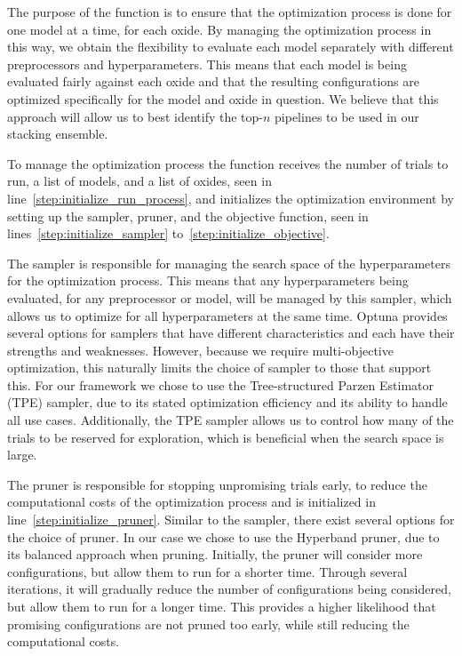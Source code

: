 The purpose of the  function is to ensure that the optimization process is done for one model at a time, for each oxide.
By managing the optimization process in this way, we obtain the flexibility to evaluate each model separately with different preprocessors and hyperparameters.
This means that each model is being evaluated fairly against each oxide and that the resulting configurations are optimized specifically for the model and oxide in question.
We believe that this approach will allow us to best identify the top-$n$ pipelines to be used in our stacking ensemble.

To manage the optimization process the function receives the number of trials to run, a list of models, and a list of oxides, seen in line~\ref{step:initialize_run_process}, and initializes the optimization environment by setting up the sampler, pruner, and the objective function, seen in lines~\ref{step:initialize_sampler} to~\ref{step:initialize_objective}.

The sampler is responsible for managing the search space of the hyperparameters for the optimization process.
This means that any hyperparameters being evaluated, for any preprocessor or model, will be managed by this sampler, which allows us to optimize for all hyperparameters at the same time.
Optuna provides several options for samplers that have different characteristics and each have their strengths and weaknesses.
However, because we require multi-objective optimization, this naturally limits the choice of sampler to those that support this.
For our framework we chose to use the Tree-structured Parzen Estimator (TPE) sampler, due to its stated optimization efficiency and its ability to handle all use cases. 
Additionally, the TPE sampler allows us to control how many of the trials to be reserved for exploration, which is beneficial when the search space is large. \cite{optuna_2019}

The pruner is responsible for stopping unpromising trials early, to reduce the computational costs of the optimization process and is initialized in line~\ref{step:initialize_pruner}.
Similar to the sampler, there exist several options for the choice of pruner.
In our case we chose to use the Hyperband pruner, due to its balanced approach when pruning.
Initially, the pruner will consider more configurations, but allow them to run for a shorter time.
Through several iterations, it will gradually reduce the number of configurations being considered, but allow them to run for a longer time.
This provides a higher likelihood that promising configurations are not pruned too early, while still reducing the computational costs.\cite{optuna_2019}

